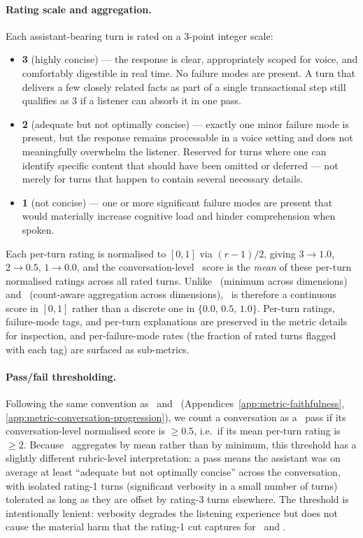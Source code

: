 \paragraph{Rating scale and aggregation.} Each assistant-bearing turn is rated on a 3-point integer scale:
\begin{itemize}
    \item \textbf{3} (highly concise) --- the response is clear, appropriately scoped for voice, and comfortably digestible in real time. No failure modes are present. A turn that delivers a few closely related facts as part of a single transactional step still qualifies as 3 if a listener can absorb it in one pass.
    \item \textbf{2} (adequate but not optimally concise) --- exactly one minor failure mode is present, but the response remains processable in a voice setting and does not meaningfully overwhelm the listener. Reserved for turns where one can identify specific content that should have been omitted or deferred --- not merely for turns that happen to contain several necessary details.
    \item \textbf{1} (not concise) --- one or more significant failure modes are present that would materially increase cognitive load and hinder comprehension when spoken.
\end{itemize}
Each per-turn rating is normalised to $[0, 1]$ via $(r - 1)/2$, giving $3 \to 1.0$, $2 \to 0.5$, $1 \to 0.0$, and the conversation-level \metricconcise~score is the \emph{mean} of these per-turn normalised ratings across all rated turns. Unlike \metricfaithfulness~(minimum across dimensions) and \metricconversationprogression~(count-aware aggregation across dimensions), \metricconcise~is therefore a continuous score in $[0, 1]$ rather than a discrete one in $\{0.0,\, 0.5,\, 1.0\}$. Per-turn ratings, failure-mode tags, and per-turn explanations are preserved in the metric details for inspection, and per-failure-mode rates (the fraction of rated turns flagged with each tag) are surfaced as sub-metrics.

\paragraph{Pass/fail thresholding.} Following the same convention as \metricfaithfulness~and \metricconversationprogression~(Appendices~\ref{app:metric-faithfulness}, \ref{app:metric-conversation-progression}), we count a conversation as a \metricconcise~pass if its conversation-level normalised score is $\geq 0.5$, i.e.\ if its mean per-turn rating is $\geq 2$. Because \metricconcise~aggregates by mean rather than by minimum, this threshold has a slightly different rubric-level interpretation: a pass means the assistant was on average at least ``adequate but not optimally concise'' across the conversation, with isolated rating-1 turns (significant verbosity in a small number of turns) tolerated as long as they are offset by rating-3 turns elsewhere. The threshold is intentionally lenient: verbosity degrades the listening experience but does not cause the material harm that the rating-1 cut captures for \metricfaithfulness~and \metricconversationprogression.

